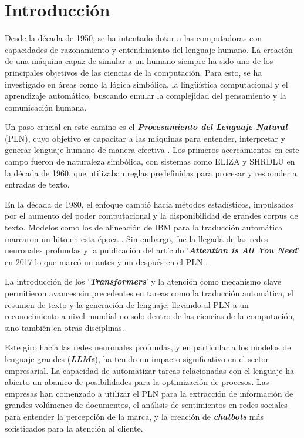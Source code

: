 \chapter*{Introducción}\label{chapter:introduction}
Desde la década de 1950, se ha intentado dotar a las computadoras con capacidades de razonamiento y entendimiento del lenguaje humano. La creación de una máquina capaz de simular a un humano siempre ha sido uno de los principales objetivos de las ciencias de la computación. Para esto, se ha investigado en áreas como la lógica simbólica, la lingüística computacional y el aprendizaje automático, buscando emular la complejidad del pensamiento y la comunicación humana.

Un paso crucial en este camino es el \textit{\textbf{Procesamiento del Lenguaje Natural}} (PLN), cuyo objetivo es capacitar a las máquinas para entender, interpretar y generar lenguaje humano de manera efectiva \cite{khurana2023natural}. Los primeros acercamientos en este campo fueron de naturaleza simbólica, con sistemas como ELIZA \cite{weizenbaum1966eliza} y SHRDLU \cite{winograd1971procedures} en la década de 1960, que utilizaban reglas predefinidas para procesar y responder a entradas de texto.

En la década de 1980, el enfoque cambió hacia métodos estadísticos, impulsados por el aumento del poder computacional y la disponibilidad de grandes corpus de texto. Modelos como los de alineación de IBM para la traducción automática marcaron un hito en esta época \cite{brown1993mathematics}. Sin embargo, fue la llegada de las redes neuronales profundas y la publicación del artículo '\textit{\textbf{Attention is All You Need}}' en 2017 lo que marcó un antes y un después en el PLN \cite{vaswani2017attention}.

La introducción de los '\textit{\textbf{Transformers}}' y la atención como mecanismo clave permitieron avances sin precedentes en tareas como la traducción automática, el resumen de texto y la generación de lenguaje, llevando al PLN a un reconocimiento a nivel mundial no solo dentro de las ciencias de la computación, sino también en otras disciplinas.

Este giro hacia las redes neuronales profundas, y en particular a los modelos de lenguaje grandes (\textit{\textbf{LLMs}}), ha tenido un impacto significativo en el sector empresarial. La capacidad de automatizar tareas relacionadas con el lenguaje ha abierto un abanico de posibilidades para la optimización de procesos. Las empresas han comenzado a utilizar el PLN para la extracción de información de grandes volúmenes de documentos, el análisis de sentimientos en redes sociales para entender la percepción de la marca, y la creación de \textit{\textbf{chatbots}} más sofisticados para la atención al cliente.

